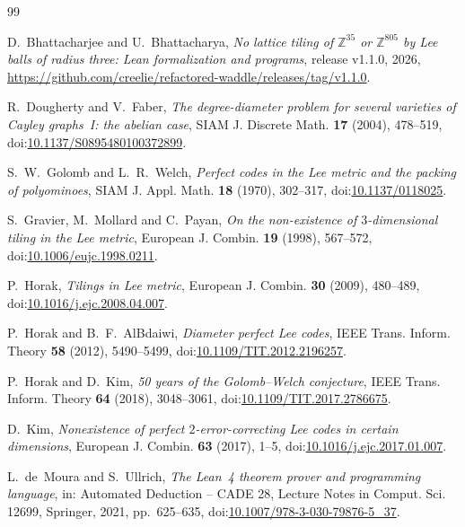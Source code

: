 \documentclass{amsart}
\theoremstyle{definition}
\theoremstyle{remark}
\numberwithin{equation}{section}
\newcommand{\releaseURL}{https://github.com/creelie/refactored-waddle/releases/tag/v1.1.0}
\begin{document}
\begin{thebibliography}{99}
\raggedright

D.~Bhattacharjee and U.~Bhattacharya, \emph{No lattice tiling of $\mathbb{Z}^{35}$ or $\mathbb{Z}^{805}$ by Lee balls of radius three: Lean formalization and programs}, release v1.1.0, 2026, \url{\releaseURL}.

R.~Dougherty and V.~Faber, \emph{The degree-diameter problem for several varieties of Cayley graphs~I: the abelian case}, SIAM J. Discrete Math. \textbf{17} (2004), 478--519, doi:\href{https://doi.org/10.1137/S0895480100372899}{10.1137/S0895480100372899}.

S.~W.~Golomb and L.~R.~Welch, \emph{Perfect codes in the Lee metric and the packing of polyominoes}, SIAM J. Appl. Math. \textbf{18} (1970), 302--317, doi:\href{https://doi.org/10.1137/0118025}{10.1137/0118025}.

S.~Gravier, M.~Mollard and C.~Payan, \emph{On the non-existence of $3$-dimensional tiling in the Lee metric}, European J. Combin. \textbf{19} (1998), 567--572, doi:\href{https://doi.org/10.1006/eujc.1998.0211}{10.1006/eujc.1998.0211}.

P.~Horak, \emph{Tilings in Lee metric}, European J. Combin. \textbf{30} (2009), 480--489, doi:\href{https://doi.org/10.1016/j.ejc.2008.04.007}{10.1016/j.ejc.2008.04.007}.

P.~Horak and B.~F.~AlBdaiwi, \emph{Diameter perfect Lee codes}, IEEE Trans. Inform. Theory \textbf{58} (2012), 5490--5499, doi:\href{https://doi.org/10.1109/TIT.2012.2196257}{10.1109/TIT.2012.2196257}.

P.~Horak and D.~Kim, \emph{50 years of the Golomb--Welch conjecture}, IEEE Trans. Inform. Theory \textbf{64} (2018), 3048--3061, doi:\href{https://doi.org/10.1109/TIT.2017.2786675}{10.1109/TIT.2017.2786675}.

D.~Kim, \emph{Nonexistence of perfect $2$-error-correcting Lee codes in certain dimensions}, European J. Combin. \textbf{63} (2017), 1--5, doi:\href{https://doi.org/10.1016/j.ejc.2017.01.007}{10.1016/j.ejc.2017.01.007}.

L.~de~Moura and S.~Ullrich, \emph{The Lean~4 theorem prover and programming language}, in: Automated Deduction -- CADE 28, Lecture Notes in Comput. Sci. 12699, Springer, 2021, pp.~625--635, doi:\href{https://doi.org/10.1007/978-3-030-79876-5_37}{10.1007/978-3-030-79876-5\_37}.


\end{thebibliography}
\end{document}
